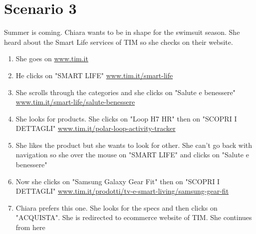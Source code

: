 \section{Scenario 3}
Summer is coming. Chiara wants to be in shape for the swimsuit season. She heard about the Smart Life services of TIM so she checks on their website.

\begin{enumerate}
	\item She goes on \url{www.tim.it}
	\item He clicks on "SMART LIFE" \url{www.tim.it/smart-life}
	\item She scrolls through the categories and she clicks on "Salute e benessere" \url{www.tim.it/smart-life/salute-benessere}
	\item She looks for products. She clicks on "Loop H7 HR" then on "SCOPRI I DETTAGLI" \url{www.tim.it/polar-loop-activity-tracker}
	\item She likes the product but she wants to look for other. She can't go back with navigation so she over the mouse on "SMART LIFE" and clicks on "Salute e benessere"
	\item Now she clicks on "Samsung Galaxy Gear Fit" then on "SCOPRI I DETTAGLI" \url{www.tim.it/prodotti/tv-e-smart-living/samsung-gear-fit}
	\item Chiara prefers this one. She looks for the specs and then clicks on "ACQUISTA". She is redirected to ecommerce website of TIM. She continues from here
\end{enumerate}

\newpage

